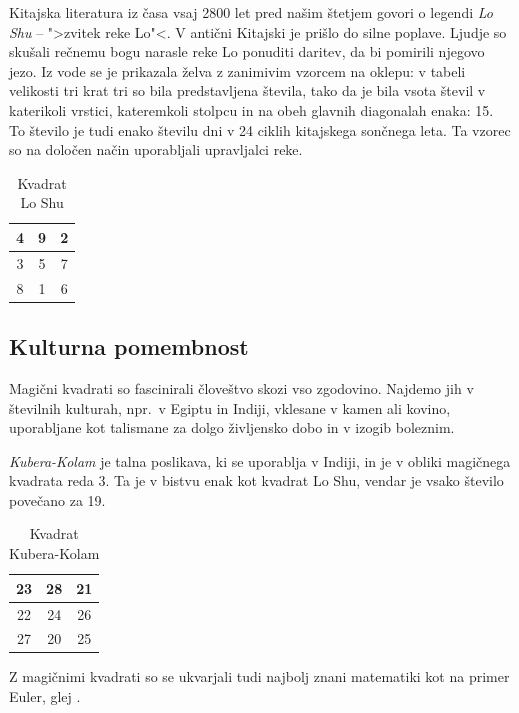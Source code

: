 \documentclass[a4paper,12pt]{article}
\theoremstyle{definition}
\theoremstyle{plain}
\newcommand{\pojem}[1]{\emph{\color{purple}#1}}
\newenvironment{magic}[3]{
   \begin{table}[!ht]
   \centering
   \caption{#2}
   \label{#3}
   \large
   \begin{tabular}{|*{#1}{c|}} \hline
}{
 \end{tabular}
   \normalsize
\end{table}  
}
\begin{document}
Kitajska literatura iz časa vsaj 2800 let pred našim štetjem govori o legendi
\pojem{Lo Shu} -- ">zvitek reke Lo"<. V antični Kitajski je prišlo do
silne poplave. Ljudje so skušali rečnemu bogu narasle reke Lo ponuditi daritev,
da bi pomirili njegovo jezo. Iz vode se je prikazala želva z zanimivim vzorcem
na oklepu: v tabeli velikosti tri krat tri so bila predstavljena števila, tako
da je bila vsota števil v katerikoli vrstici, kateremkoli stolpcu in na obeh
glavnih diagonalah enaka: 15. To število je tudi enako številu dni v 24 ciklih
kitajskega sončnega leta. Ta vzorec so na določen način uporabljali upravljalci
reke.

\begin{magic}{3}{Kvadrat Lo Shu}{table:loshu}
   4 & 9 & 2 \\\hline
   3 & 5 & 7 \\\hline
   8 & 1 & 6 \\\hline
\end{magic}


\subsection{Kulturna pomembnost}

Magični kvadrati so fascinirali človeštvo skozi vso zgodovino. Najdemo jih
v številnih kulturah, npr.\ v Egiptu in Indiji, vklesane v kamen ali
kovino, uporabljane kot talismane za dolgo življensko dobo in v
izogib boleznim.

\pojem{Kubera-Kolam} je talna poslikava, ki se uporablja v Indiji, in je v
obliki magičnega kvadrata reda 3. Ta je v bistvu enak kot kvadrat
Lo Shu, vendar je vsako število povečano za 19.



\begin{magic}{3}{Kvadrat Kubera-Kolam}{table:kubera}
      23 & 28 & 21 \\\hline
      22 & 24 & 26 \\\hline
      27 & 20 & 25 \\\hline
\end{magic}

Z magičnimi kvadrati so se ukvarjali tudi najbolj znani matematiki kot na
primer Euler, glej \cite{euler}. %
\end{document}

